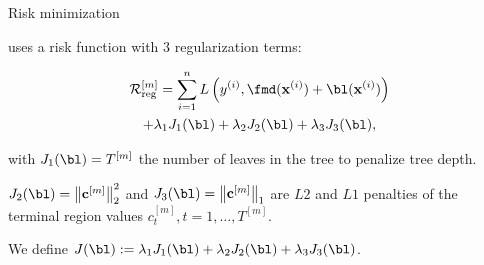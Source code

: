 \documentclass[11pt,compress,t,notes=noshow, xcolor=table]{beamer}
\begin{document}

\begin{vbframe}{Risk minimization}

     uses a risk function with 3 regularization terms:

    \begin{multline*}
      \riskr^{[m]} = \sum_{i=1}^{n} L\left(\yi, \fmd(\xi) + \bl(\xi)\right)\\
       + \lambda_1 J_1(\bl) + \lambda_2 J_2(\bl) + \lambda_3 J_3(\bl),
    \end{multline*}

    \lz

    with $J_1(\bl) = T^{[m]}$ the number of leaves in the tree to penalize tree depth.

    \lz

    $J_2(\bl) = \left\|\mathbf{c}^{[m]}\right\|^2_2$ and $J_3(\bl) = \left\|\mathbf{c}^{[m]}\right\|_1$ are $L2$ and $L1$ penalties of the terminal region values $c_t^{[m]}, t=1,\dots,T^{[m]}$.

    \lz

    We define $J(\bl) := \lambda_1 J_1(\bl) + \lambda_2 J_2(\bl) + \lambda_3 J_3(\bl)$.

    \framebreak









\end{vbframe}
\end{document}
